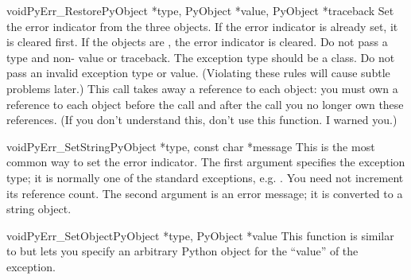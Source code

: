 \begin{cfuncdesc}{void}{PyErr_Restore}{PyObject *type, PyObject *value,
                                       PyObject *traceback}
  Set  the error indicator from the three objects.  If the error
  indicator is already set, it is cleared first.  If the objects are
  \NULL, the error indicator is cleared.  Do not pass a \NULL{} type
  and non-\NULL{} value or traceback.  The exception type should be a
  class.  Do not pass an invalid exception type or value.
  (Violating these rules will cause subtle problems later.)  This call
  takes away a reference to each object: you must own a reference to
  each object before the call and after the call you no longer own
  these references.  (If you don't understand this, don't use this
  function.  I warned you.)  
\end{cfuncdesc}

\begin{cfuncdesc}{void}{PyErr_SetString}{PyObject *type, const char *message}
  This is the most common way to set the error indicator.  The first
  argument specifies the exception type; it is normally one of the
  standard exceptions, e.g. .  You need not
  increment its reference count.  The second argument is an error
  message; it is converted to a string object.
\end{cfuncdesc}

\begin{cfuncdesc}{void}{PyErr_SetObject}{PyObject *type, PyObject *value}
  This function is similar to  but lets
  you specify an arbitrary Python object for the ``value'' of the
  exception.
\end{cfuncdesc}

